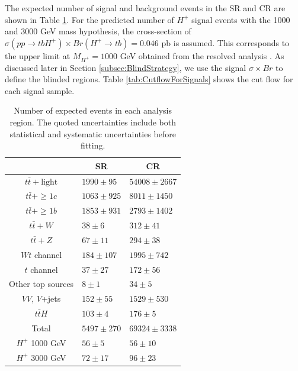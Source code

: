 The expected number of signal and background events in the SR and CR are shown in Table \ref{tab:PrefitYields}. For the predicted number of $H^{+}$ signal events with the 1000 and 3000 GeV mass hypothesis, the cross-section of ${\sigma}(pp{\rightarrow}tbH^{+}){\times}Br(H^{+}{\rightarrow}tb)=0.046$ pb is assumed. This corresponds to the upper limit at $M_{H^{+}}=1000$ GeV obtained from the resolved analysis \cite{HDBS-2021-02}. As discussed later in Section \ref{subsec:BlindStrategy}, we use the signal ${\sigma}{\times}Br$ to define the blinded regions. Table \ref{tab:CutflowForSignals} shows the cut flow for each signal sample.

\begin{table}[H]
  \centering
  \begin{tabular*}{120mm}{@{\extracolsep{\fill}}cll}
    \hline\hline
                            & \multicolumn{1}{c}{SR} & \multicolumn{1}{c}{CR}\\
    \hline
    $t\bar{t}+\text{light}$ & $1990\pm  95$           & $ 54008\pm 2667$ \\
    $t\bar{t}+\geq1c$       & $1063\pm 925$           & $  8011\pm 1450$ \\
    $t\bar{t}+\geq1b$       & $1853\pm 931$           & $  2793\pm 1402$ \\
    $t\bar{t}+W$            & $  38\pm   6$           & $   312\pm   41$ \\
    $t\bar{t}+Z$            & $  67\pm  11$           & $   294\pm   38$ \\
    $Wt$ channel            & $ 184\pm 107$           & $  1995\pm  742$ \\
    $t$ channel             & $  37\pm  27$           & $   172\pm   56$ \\
    Other top sources       & $   8\pm   1$           & $    34\pm    5$ \\
    $VV$, $V$+jets          & $ 152\pm  55$           & $  1529\pm  530$ \\
    $t\bar{t}H$             & $ 103\pm   4$           & $   176\pm    5$ \\
    \hline
    Total                   & $5497\pm 270$           & $ 69324\pm 3338$ \\
    \hline
    $H^{+}$ 1000 GeV        & $  56\pm  5$           & $     56\pm   10$ \\
    $H^{+}$ 3000 GeV        & $  72\pm 17$           & $     96\pm   23$ \\
    \hline\hline
  \end{tabular*}
  \caption{Number of expected events in each analysis region. The quoted uncertainties include both statistical and systematic uncertainties before fitting.}
  \label{tab:PrefitYields}
\end{table}

